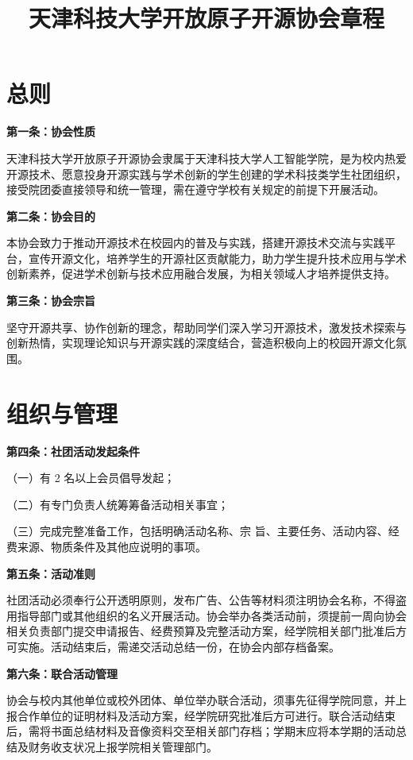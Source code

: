 \documentclass{mjsart}
\title{天津科技大学开放原子开源协会章程}
\begin{document}
\maketitle
\section{总则}

\textbf{第一条：协会性质}

天津科技大学开放原子开源协会隶属于天津科技大学人工智能学院，是为校内热爱开源技术、愿意投身开源实践与学术创新的学生创建的学术科技类学生社团组织，接受院团委直接领导和统一管理，需在遵守学校有关规定的前提下开展活动。

\textbf{第二条：协会目的}

本协会致力于推动开源技术在校园内的普及与实践，搭建开源技术交流与实践平台，宣传开源文化，培养学生的开源社区贡献能力，助力学生提升技术应用与学术创新素养，促进学术创新与技术应用融合发展，为相关领域人才培养提供支持。

\textbf{第三条：协会宗旨}

坚守开源共享、协作创新的理念，帮助同学们深入学习开源技术，激发技术探索与创新热情，实现理论知识与开源实践的深度结合，营造积极向上的校园开源文化氛围。

\section{组织与管理}

\textbf{第四条：社团活动发起条件}

（一）有 2 名以上会员倡导发起；

（二）有专门负责人统筹筹备活动相关事宜；

（三）完成完整准备工作，包括明确活动名称、宗 旨、主要任务、活动内容、经费来源、物质条件及其他应说明的事项。

\textbf{第五条：活动准则}

社团活动必须奉行公开透明原则，发布广告、公告等材料须注明协会名称，不得盗用指导部门或其他组织的名义开展活动。协会举办各类活动前，须提前一周向协会相关负责部门提交申请报告、经费预算及完整活动方案，经学院相关部门批准后方可实施。活动结束后，需递交活动总结一份，在协会内部存档备案。

\textbf{第六条：联合活动管理}

协会与校内其他单位或校外团体、单位举办联合活动，须事先征得学院同意，并上报合作单位的证明材料及活动方案，经学院研究批准后方可进行。联合活动结束后，需将书面总结材料及音像资料交至相关部门存档；学期末应将本学期的活动总结及财务收支状况上报学院相关管理部门。
\end{document}
